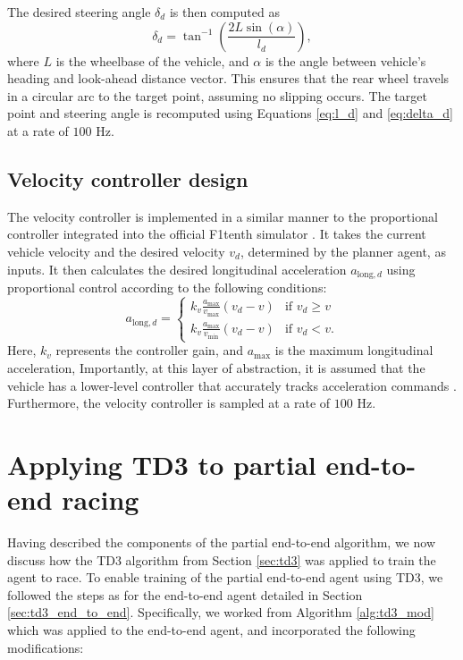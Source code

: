 The desired steering angle $\delta_d$ is then computed as
\begin{equation}\label{eq:delta_d}
    \delta_d = \tan^{-1} \left( \frac{2L\sin(\alpha)}{l_d} \right),
\end{equation}
where $L$ is the wheelbase of the vehicle, and $\alpha$ is the angle between vehicle's heading and look-ahead distance vector.
This ensures that the rear wheel travels in a circular arc to the target point, assuming no slipping occurs. 
The target point and steering angle is recomputed using Equations \ref{eq:l_d} and \ref{eq:delta_d} at a rate of $100$ Hz.



\subsection{Velocity controller design}

The velocity controller is implemented in a similar manner to the proportional controller integrated into the official F1tenth simulator \cite{f1tenth}.
It takes the current vehicle velocity and the desired velocity $v_d$, determined by the planner agent, as inputs. 
It then calculates the desired longitudinal acceleration $a_{\text{long},d}$ using proportional control according to the following conditions:
\begin{equation}
    a_{\text{long},d} = 
    \begin{cases}
        k_v \frac{a_{\text{max}}}{v_{\text{max}}}(v_d - v) & \text{if } v_d \geq v\\
        k_v \frac{a_{\text{max}}}{v_{\text{min}}}(v_d - v) & \text{if } v_d < v.
    \end{cases}
\label{eq:vel_control}
\end{equation}
Here, $k_v$ represents the controller gain, and $a_{\text{max}}$ is the maximum longitudinal acceleration,
Importantly, at this layer of abstraction, it is assumed that the vehicle has a lower-level controller that accurately tracks acceleration commands \cite{Betz2021, Rajamani2012}.
Furthermore, the velocity controller is sampled at a rate of $100$ Hz.


\section{Applying TD3 to partial end-to-end racing}

Having described the components of the partial end-to-end algorithm, we now discuss how the TD3 algorithm from Section \ref{sec:td3} was applied to train the agent to race.
To enable training of the partial end-to-end agent using TD3, we followed the steps as for the end-to-end agent detailed in Section \ref{sec:td3_end_to_end}. 
Specifically, we worked from Algorithm \ref{alg:td3_mod} which was applied to the end-to-end agent, and incorporated the following modifications:


